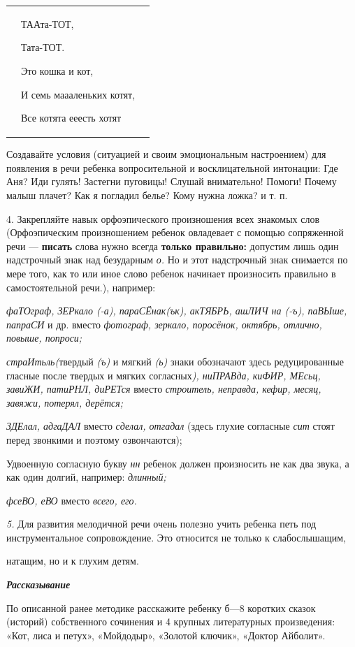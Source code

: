 \documentclass[a5paper]{book}
\renewcommand{\emph}[1]{\textit{#1}}
\begin{document}
\hfill\begin{tabular}{p{}p{}p{}}
&
ТААта-ТОТ,

Тата-ТОТ.

Это кошка и кот,

И семь маааленьких котят,

Все котята ееесть хотят&
\end{tabular}


Создавайте условия (ситуацией и своим эмоциональным настроением) для
появления в речи ребенка вопросительной и восклицательной интонации: Где
Аня? Иди гулять! Застегни пуговицы! Слушай внимательно! Помоги! Почему
малыш плачет? Как я погладил белье? Кому нужна ложка? и т. п.

4. Закрепляйте навык орфоэпического произношения всех знакомых слов
(Орфоэпическим произношением ребенок овладевает с помощью сопряженной
речи --- \textbf{писать} слова нужно всегда \textbf{только правильно:}
допустим лишь один надстрочный знак над безударным \emph{о.} Но и этот
надстрочный знак снимается по мере того, как то или иное слово ребенок
начинает произносить правильно в самостоятельной речи.), например:

\emph{фаТОграф, ЗЕРкало (-а), параСЁнак(ък), акТЯБРЬ, ашЛИЧ на (-ъ),
паВЫше, папраСИ} и др. вместо \emph{фотограф, зеркало, поросёнок,
октябрь, отлично, повыше, попроси;}

\emph{страИтьль(}твердый \emph{(ъ)} и мягкий \emph{(ь)} знаки обозначают
здесь редуцированные гласные после твердых и мягких согласных\emph{),
ниПРАВда, киФИР, МЕсьц, завиЖИ, патиРНЛ, диРЕТся} вместо
\emph{строитель, неправда, кефир, месяц, завяжи, потерял, дерётся;}

\emph{ЗДЕлал, адгаДАЛ} вместо \emph{сделал, отгадал} (здесь глухие
согласные \emph{сит} стоят перед звонкими и поэтому озвончаются);

Удвоенную согласную букву \emph{нн} ребенок должен произносить не как
два звука, а как один долгий, например: \emph{длинный;}

\emph{фсеВО, еВО} вместо \emph{всего, его.}

\emph{5.} Для развития мелодичной речи очень полезно учить ребенка петь
под инструментальное сопровождение. Это относится не только к
слабослышащим,

натащим, но и к глухим детям.

\emph{\textbf{Рассказывание}}

По описанной ранее методике расскажите ребенку б---8 коротких сказок
(историй) собственного сочинения и 4 крупных литературных произведения:
«Кот, лиса и петух», «Мойдодыр», «Золотой ключик», «Доктор Айболит».
\end{document}
